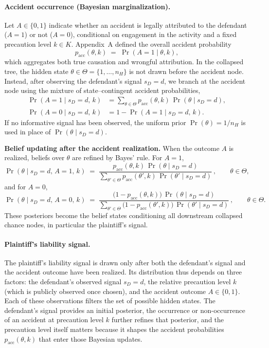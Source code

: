 \documentclass{article}
\begin{document}
\paragraph{Accident occurrence (Bayesian marginalization).}
Let $A\in\{0,1\}$ indicate whether an accident is legally attributed to the defendant ($A=1$) or not ($A=0$), conditional on engagement in the activity and a fixed precaution level $k\in K$. Appendix~A defined the overall accident probability
\[
p_{\mathrm{acc}}(\theta,k) \;=\; \Pr(A=1 \mid \theta,k),
\]
which aggregates both true causation and wrongful attribution. In the collapsed tree, the hidden state $\theta\in\Theta=\{1,\dots,n_H\}$ is not drawn before the accident node. Instead, after observing the defendant’s signal $s_D=d$, we branch at the accident node using the mixture of state–contingent accident probabilities,
\[
\begin{aligned}
\Pr(A=1 \mid s_D=d,\,k) 
   &= \sum_{\theta\in\Theta} p_{\mathrm{acc}}(\theta,k)\,\Pr(\theta \mid s_D=d), \\
\Pr(A=0 \mid s_D=d,\,k) 
   &= 1-\Pr(A=1 \mid s_D=d,\,k).
\end{aligned}
\]
If no informative signal has been observed, the uniform prior $\Pr(\theta)=1/n_H$ is used in place of $\Pr(\theta \mid s_D=d)$.

\medskip
\noindent\textbf{Belief updating after the accident realization.}
When the outcome $A$ is realized, beliefs over $\theta$ are refined by Bayes’ rule. For $A=1$,
\[
\Pr(\theta \mid s_D=d,\,A=1,\,k)
\;=\;
\frac{p_{\mathrm{acc}}(\theta,k)\,\Pr(\theta \mid s_D=d)}
{\sum_{\theta'\in\Theta} p_{\mathrm{acc}}(\theta',k)\,\Pr(\theta' \mid s_D=d)}\,,
\qquad \theta\in\Theta,
\]
and for $A=0$,
\[
\Pr(\theta \mid s_D=d,\,A=0,\,k)
\;=\;
\frac{\bigl(1-p_{\mathrm{acc}}(\theta,k)\bigr)\,\Pr(\theta \mid s_D=d)}
{\sum_{\theta'\in\Theta} \bigl(1-p_{\mathrm{acc}}(\theta',k)\bigr)\,\Pr(\theta' \mid s_D=d)}\,,
\qquad \theta\in\Theta.
\]
These posteriors become the belief states conditioning all downstream collapsed chance nodes, in particular the plaintiff’s signal.

\paragraph{Plaintiff’s liability signal.}
The plaintiff’s liability signal is drawn only after both the defendant’s signal and the accident outcome have been realized. Its distribution thus depends on three factors: the defendant’s observed signal $s_D=d$, the relative precaution level $k$ (which is publicly observed once chosen), and the accident outcome $A\in\{0,1\}$. Each of these observations filters the set of possible hidden states. The defendant’s signal provides an initial posterior, the occurrence or non-occurrence of an accident at precaution level $k$ further refines that posterior, and the precaution level itself matters because it shapes the accident probabilities $p_{\mathrm{acc}}(\theta,k)$ that enter those Bayesian updates.
\end{document}
